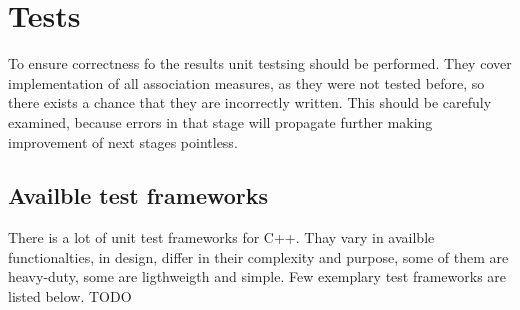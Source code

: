 \chapter{Tests}
To ensure correctness fo the results unit testsing should be performed. They cover implementation of all association measures, 
as they were not tested before, so there exists a chance that they are incorrectly written. This should be carefuly examined, 
because errors in that stage will propagate further making improvement of next stages pointless.

\section{Availble test frameworks}
There is a lot of unit test frameworks for C++. Thay vary in availble functionalties, in design, differ in their complexity and purpose, 
some of them are heavy-duty, some are ligthweigth and simple. Few exemplary test frameworks are listed below.
TODO
